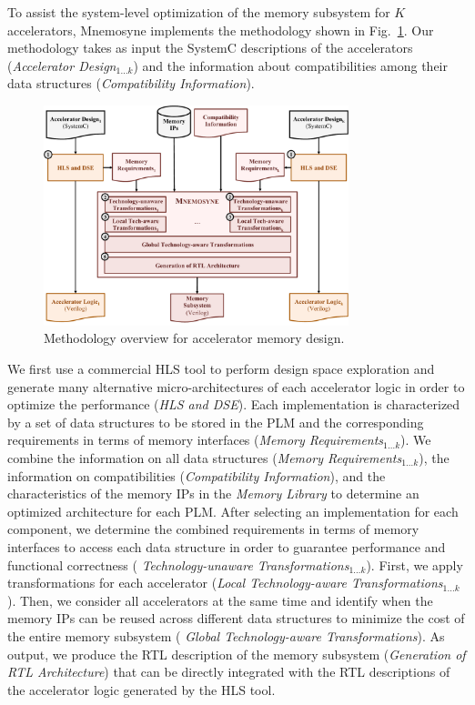 To assist the system-level optimization of the memory subsystem for $K$
accelerators, {\sc Mnemosyne} implements the methodology shown in Fig.~\ref{fig:methodology}.
Our methodology takes as input the SystemC descriptions of the accelerators
({\it Accelerator Design$_{1\dots k}$}) and the information about
compatibilities among their data structures ({\it Compatibility Information}).
%

\begin{figure}[h!p]
\centering
\includegraphics[height=6.4cm]{fig/methodology.pdf}
\caption{Methodology overview for accelerator memory
	design.}\label{fig:methodology}
\end{figure}

We first use a commercial HLS tool to perform design space exploration and generate
many alternative micro-architectures of each accelerator logic in order to
optimize the performance ({\it HLS and DSE}). Each implementation is
characterized by a set of data structures to be stored in the PLM and the
corresponding requirements in terms of memory interfaces ({\it Memory
Requirements$_{1\dots k}$}).
We combine the information on all data structures ({\it Memory Requirements$_{1\dots k}$}),
the information on compatibilities ({\it Compatibility Information}),
and the characteristics of the memory IPs in the
{\it Memory Library} to determine an optimized architecture for each PLM. 
After selecting an implementation for each component, we determine the combined
requirements in terms of memory interfaces to access each data structure in
order to guarantee performance and functional correctness ({\it
Technology-unaware Transformations$_{1\dots k}$}).
First,
we apply transformations for each accelerator ({\it Local Technology-aware
Transformations$_{1\dots k}$}). Then, we consider all accelerators at the same
time and identify when the memory IPs can be reused across different data
structures to minimize the cost of the entire memory subsystem ({\it
Global Technology-aware Transformations}). As output, we produce the RTL
description of the memory subsystem ({\it Generation of RTL Architecture}) that
can be directly integrated with the RTL descriptions of the accelerator logic
generated by the HLS tool.

